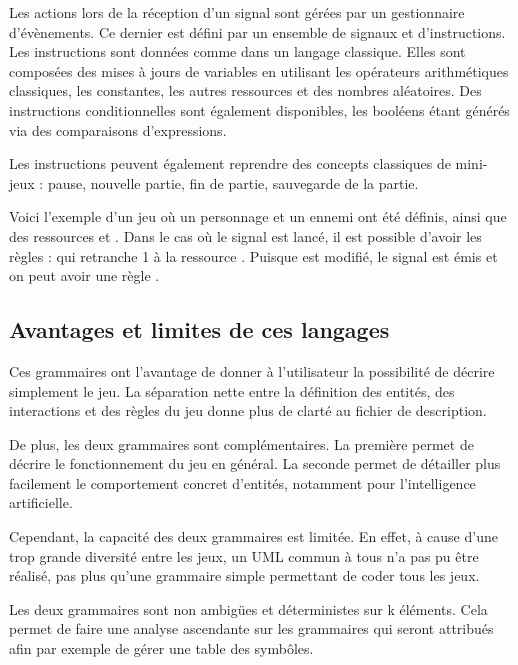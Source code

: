 Les actions lors de la réception d'un signal sont gérées par un gestionnaire d'évènements.
Ce dernier est défini par un ensemble de signaux et d'instructions.
Les instructions sont données comme dans un langage classique.
Elles sont composées des mises à jours de variables en utilisant les opérateurs arithmétiques classiques, les constantes, les autres ressources et des nombres
aléatoires.
Des instructions conditionnelles sont également disponibles, les booléens étant générés via des comparaisons d'expressions.

Les instructions peuvent également reprendre des concepts classiques de mini-jeux : pause, nouvelle partie, fin de partie, sauvegarde de la partie.

Voici l'exemple  d'un jeu où un personnage  et un ennemi  ont été définis, ainsi que des ressources  et .
Dans le cas où le signal  est lancé, il est possible d'avoir les règles :
 qui retranche 1 à la ressource .
Puisque  est modifié, le signal  est émis et on peut avoir une règle
.

\subsection{Avantages et limites de ces langages}

Ces grammaires ont l'avantage de donner à l'utilisateur la possibilité de décrire simplement le jeu.
La séparation nette entre la définition des entités, des interactions et des règles du jeu donne plus de clarté au fichier de description.

De plus, les deux grammaires sont complémentaires. La première permet de décrire le fonctionnement du jeu en général. La seconde permet
de détailler plus facilement le comportement concret d'entités, notamment pour l'intelligence artificielle.

Cependant, la capacité des deux grammaires est limitée.
En effet, à cause d'une trop grande diversité entre les jeux, un UML commun à tous n'a pas pu être réalisé,
 pas plus qu'une grammaire simple permettant de coder tous les jeux.

Les deux grammaires sont non ambigües et déterministes sur k éléments.
Cela permet de faire une analyse ascendante sur les grammaires qui seront attribués afin par exemple de gérer une table des symbôles.
